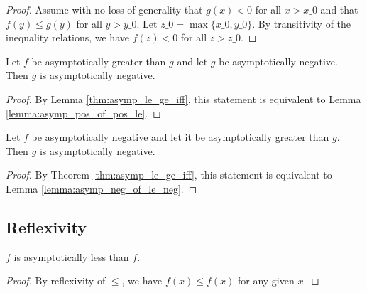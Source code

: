 \begin{proof}
    \leanok
    Assume with no loss of generality that $g(x) < 0$ for all $x > x\_0$ and that
    $f(y) \le g(y)$ for all $y > y\_0$. Let $z\_0 = \max \{ x\_0, y\_0 \}$. By transitivity
    of the inequality relations, we have $f(z) < 0$ for all $z > z\_0$. 
\end{proof}

\begin{lemma}
    \label{lemma:asymp_pos_of_ge_pos}
    \leanok
    Let $f$ be asymptotically greater than $g$ and let $g$ be asymptotically negative.
    Then $g$ is asymptotically negative.
\end{lemma}

\begin{proof}
    \leanok
    By Lemma \ref{thm:asymp_le_ge_iff}, this statement is equivalent to Lemma
    \ref{lemma:asymp_pos_of_pos_le}.
\end{proof}

\begin{lemma}
    \label{lemma:asymp_neg_of_neg_ge}
    \leanok
    Let $f$ be asymptotically negative and let it be asymptotically greater than $g$.
    Then $g$ is asymptotically negative.
\end{lemma}

\begin{proof}
    \leanok
    By Theorem \ref{thm:asymp_le_ge_iff}, this statement is equivalent to Lemma
    \ref{lemma:asymp_neg_of_le_neg}.
\end{proof}


\subsection{Reflexivity}

\begin{lemma}
    \label{lemma:asymp_le_refl}
    \leanok
    $f$ is asymptotically less than $f$.
\end{lemma}

\begin{proof}
    \leanok
    By reflexivity of $\le$, we have $f(x) \le f(x)$ for any given $x$.
\end{proof}

